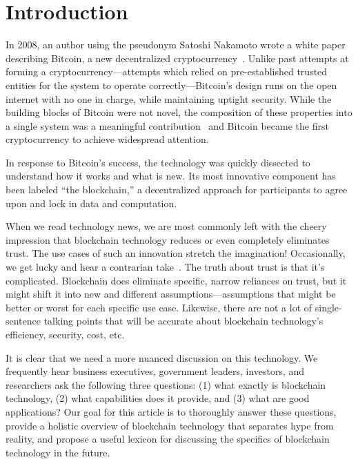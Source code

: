 
\section{Introduction}

In 2008, an author using the pseudonym Satoshi Nakamoto wrote a white paper describing Bitcoin, a new decentralized cryptocurrency~\cite{Nak08}. Unlike past attempts at forming a cryptocurrency---attempts which relied on pre-established trusted entities for the system to operate correctly---Bitcoin's design runs on the open internet with no one in charge, while maintaining uptight security. While the building blocks of Bitcoin were not novel, the composition of these properties into a single system was a meaningful contribution~\cite{Narayanan17} and Bitcoin became the first cryptocurrency to achieve widespread attention.

In response to Bitcoin's success, the technology was quickly dissected to understand how it works and what is new. Its most innovative component has been labeled ``the blockchain,'' a decentralized approach for participants to agree upon and lock in data and computation.

When we read technology news, we are most commonly left with the cheery impression that blockchain technology reduces or even completely eliminates trust. The use cases of such an innovation stretch the imagination! Occasionally, we get lucky and hear a contrarian take~\cite{Sch19}. The truth about trust is that it's complicated. Blockchain does eliminate specific, narrow reliances on trust, but it might shift it into new and different assumptions---assumptions that might be better or worst for each specific use case. Likewise, there are not a lot of single-sentence talking points that will be accurate about blockchain technology's efficiency, security, cost, etc. 

It is clear that we need a more nuanced discussion on this technology. We frequently hear business executives, government leaders, investors, and researchers ask the following three questions: (1) what exactly is blockchain technology, (2) what capabilities does it provide, and (3) what are good applications? Our goal for this article is to thoroughly answer these questions,  provide a holistic overview of blockchain technology that separates hype from reality, and propose a useful lexicon for discussing the specifics of blockchain technology in the future.

